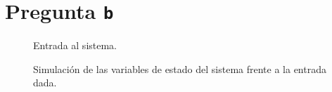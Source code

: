 \section{Pregunta \texttt{b}}\label{pregunta-b}

\begin{figure}[h]
  \centering
  
  \caption{Entrada al sistema.}\label{fig:entrada-sim}
\end{figure}

\begin{figure}[h]
  \centering
  
  \caption{Simulación de las variables de estado del sistema frente a la entrada dada.}\label{fig:estado-sim}
\end{figure}

